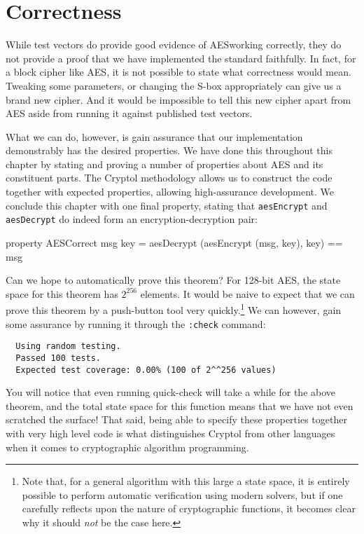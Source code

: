 \section{Correctness}
\label{sec:aescorrectattempt}

While test vectors do provide good evidence of AES\indAES working
correctly, they do not provide a proof that we have implemented the
standard faithfully. In fact, for a block cipher like AES, it is not
possible to state what correctness would mean.  Tweaking some
parameters, or changing the S-box appropriately can give us a brand
new cipher.  And it would be impossible to tell this new cipher apart
from AES aside from running it against published test vectors.


What we can do, however, is gain assurance that our implementation
demonstrably has the desired properties. We have done this throughout
this chapter by stating and proving a number of properties about AES
and its constituent parts. The Cryptol methodology allows us to
construct the code together with expected properties, allowing
high-assurance development. We conclude this chapter with one final
property, stating that {\tt aesEncrypt} and {\tt aesDecrypt} do indeed
form an encryption-decryption pair:

\begin{code}
  property AESCorrect msg key = aesDecrypt (aesEncrypt (msg, key), key) == msg
\end{code}

Can we hope to automatically prove this theorem?  For 128-bit AES, the
state space for this theorem has $2^{256}$ elements.  It would be
naive to expect that we can prove this theorem by a push-button tool
very quickly.\footnote{Note that, for a general algorithm with this
  large a state space, it is entirely possible to perform automatic
  verification using modern solvers, but if one carefully reflects
  upon the nature of cryptographic functions, it becomes clear why it
  should \emph{not} be the case here.}  We can however, gain some
assurance by running it through the {\tt :check} command:\indCmdCheck

\begin{Verbatim}
  Using random testing.
  Passed 100 tests.
  Expected test coverage: 0.00% (100 of 2^^256 values)
\end{Verbatim}
You will notice that even running quick-check will take a while for
the above theorem, and the total state space for this function means
that we have not even scratched the surface! That said, being able to
specify these properties together with very high level code is what
distinguishes Cryptol from other languages when it comes to
cryptographic algorithm programming.

